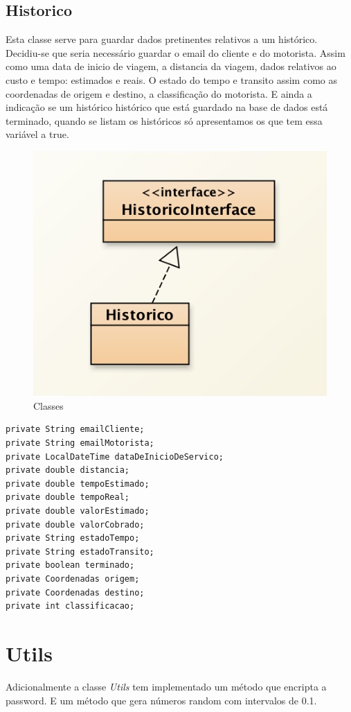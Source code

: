 \subsection{Historico}

Esta classe serve para guardar dados pretinentes relativos a um histórico. Decidiu-se que seria necessário guardar o email do cliente e do motorista. Assim como uma data de inicio de viagem, a distancia da viagem, dados relativos ao custo e tempo: estimados e reais. O estado do tempo e transito assim como as coordenadas de origem e destino, a classificação do motorista. E ainda a indicação se um histórico histórico que está guardado na base de dados está terminado, quando se listam os históricos só apresentamos os que tem essa variável a true. 

\begin{figure}[htpb]
	\centering
	\includegraphics[scale=0.6]{imagem/historico}
	\caption{Classes }
	\label{p2:fig:p2_historico}
\end{figure}
\begin{verbatim}
private String emailCliente; 
private String emailMotorista; 
private LocalDateTime dataDeInicioDeServico;
private double distancia;
private double tempoEstimado; 
private double tempoReal;
private double valorEstimado; 
private double valorCobrado; 
private String estadoTempo;
private String estadoTransito; 
private boolean terminado; 
private Coordenadas origem;
private Coordenadas destino;
private int classificacao;
\end{verbatim}

\section{Utils}
Adicionalmente a classe \textit{Utils} tem implementado um método que encripta a password. E um método que gera números random com intervalos de 0.1. 

